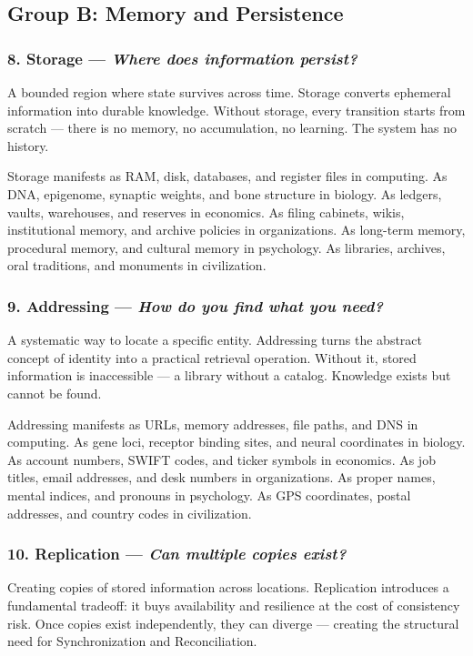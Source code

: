 \documentclass[11pt,a4paper]{article}
\newcommand{\question}[1]{\textit{#1}}
\begin{document}
\subsection{Group B: Memory and Persistence}

\subsubsection{8. Storage --- \question{Where does information persist?}}

A bounded region where state survives across time. Storage converts ephemeral information into durable knowledge. Without storage, every transition starts from scratch --- there is no memory, no accumulation, no learning. The system has no history.

Storage manifests as RAM, disk, databases, and register files in computing. As DNA, epigenome, synaptic weights, and bone structure in biology. As ledgers, vaults, warehouses, and reserves in economics. As filing cabinets, wikis, institutional memory, and archive policies in organizations. As long-term memory, procedural memory, and cultural memory in psychology. As libraries, archives, oral traditions, and monuments in civilization.

\subsubsection{9. Addressing --- \question{How do you find what you need?}}

A systematic way to locate a specific entity. Addressing turns the abstract concept of identity into a practical retrieval operation. Without it, stored information is inaccessible --- a library without a catalog. Knowledge exists but cannot be found.

Addressing manifests as URLs, memory addresses, file paths, and DNS in computing. As gene loci, receptor binding sites, and neural coordinates in biology. As account numbers, SWIFT codes, and ticker symbols in economics. As job titles, email addresses, and desk numbers in organizations. As proper names, mental indices, and pronouns in psychology. As GPS coordinates, postal addresses, and country codes in civilization.

\subsubsection{10. Replication --- \question{Can multiple copies exist?}}

Creating copies of stored information across locations. Replication introduces a fundamental tradeoff: it buys availability and resilience at the cost of consistency risk. Once copies exist independently, they can diverge --- creating the structural need for Synchronization and Reconciliation.
\end{document}
